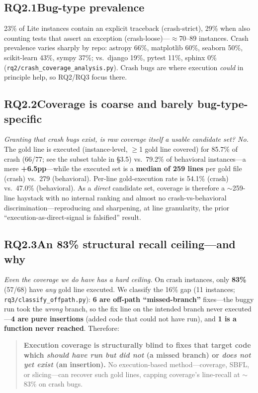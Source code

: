 \documentclass[11pt]{article}
\newcommand{\code}[1]{\texttt{#1}}
\begin{document}
\subsection*{RQ2.1\quad Bug-type prevalence}
23\% of Lite instances contain an explicit traceback (crash-strict), 29\% when also counting tests that assert an exception (crash-loose)---$\approx$70--89 instances. Crash prevalence varies sharply by repo: astropy 66\%, matplotlib 60\%, seaborn 50\%, scikit-learn 43\%, sympy 37\%; vs.\ django 19\%, pytest 11\%, sphinx 0\% (\code{rq2/crash\_coverage\_analysis.py}). Crash bugs are where execution \emph{could} in principle help, so RQ2/RQ3 focus there.

\subsection*{RQ2.2\quad Coverage is coarse and barely bug-type-specific}
\emph{Granting that crash bugs exist, is raw coverage itself a usable candidate set? No.} The gold line is executed (instance-level, $\ge$1 gold line covered) for 85.7\% of crash (66/77; see the subset table in \S3.5) vs.\ 79.2\% of behavioral instances---a mere \textbf{+6.5pp}---while the executed set is a \textbf{median of 259 lines} per gold file (crash) vs.\ 279 (behavioral). Per-line gold-execution rate is 54.1\% (crash) vs.\ 47.0\% (behavioral). As a \emph{direct} candidate set, coverage is therefore a $\sim$259-line haystack with no internal ranking and almost no crash-vs-behavioral discrimination---reproducing and sharpening, at line granularity, the prior ``execution-as-direct-signal is falsified'' result.

\subsection*{RQ2.3\quad An 83\% structural recall ceiling---and why}
\emph{Even the coverage we do have has a hard ceiling.} On crash instances, only \textbf{83\%} (57/68) have \emph{any} gold line executed. We classify the 16\% gap (11 instances; \code{rq3/classify\_offpath.py}): \textbf{6 are off-path ``missed-branch''} fixes---the buggy run took the \emph{wrong} branch, so the fix line on the intended branch never executed---\textbf{4 are pure insertions} (added code that could not have run), and \textbf{1 is a function never reached}. Therefore:

\begin{quote}
\textbf{Execution coverage is structurally blind to fixes that target code which \emph{should have run but did not} (a missed branch) or \emph{does not yet exist} (an insertion).} No execution-based method---coverage, SBFL, or slicing---can recover such gold lines, capping coverage's line-recall at $\sim$83\% on crash bugs.
\end{quote}
\end{document}
